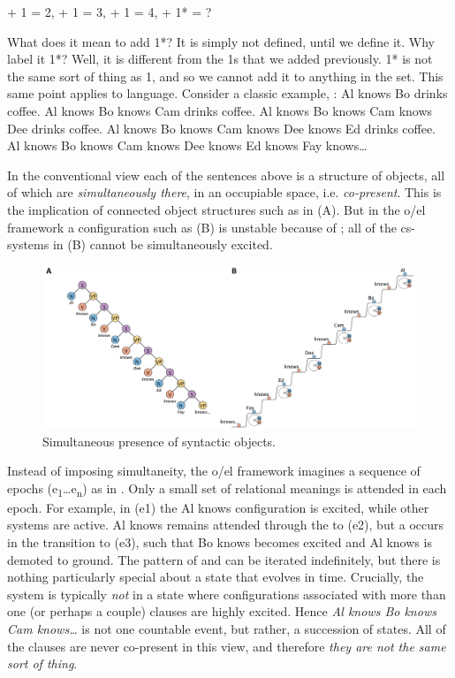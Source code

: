    + 1 = 2,  + 1 = 3,  + 1 = 4,  + 1* = ?
\z

  What does it mean to add 1*? It is simply not defined, until we define it. Why label it 1*? Well, it is different from the 1s that we added previously. 1* is not the same sort of thing as 1, and so we cannot add it to anything in the set. This same point applies to language. Consider a classic example, :
\ea
\ea
{Al knows Bo drinks coffee.}
\ex
{Al knows Bo knows Cam drinks coffee.}
\ex
{Al knows Bo knows Cam knows Dee drinks coffee.}
\ex
{Al knows Bo knows Cam knows Dee knows Ed drinks coffee.}
\ex
{Al knows Bo knows Cam knows Dee knows Ed knows Fay knows…}
\z
\z

In the conventional view each of the sentences above is a structure of objects, all of which are \textit{simultaneously there}, in an occupiable space, i.e. \textit{co-present}. This is the implication of connected object structures such as in {}(A). But in the o/el framework a configuration such as {}(B) is unstable because of ; all of the cs-sys\-tems in (B) cannot be simultaneously excited. 

  
\begin{figure}
\includegraphics[width=\textwidth]{figures/Tilsen-img105.png}
\caption{Simultaneous presence of syntactic objects.}
\label{fig:5:1}
\end{figure}
 

  Instead of imposing simultaneity, the o/el framework imagines a sequence of epochs (e\textsubscript{1}…e\textsubscript{n}) as in {}. Only a small set of relational meanings is attended in each epoch. For example, in (e1) the {\textbar}Al knows{\textbar} configuration is excited, while other systems are active. {\textbar}Al knows{\textbar} remains attended through the  to (e2),  but a  occurs in the transition to (e3), such that {\textbar}Bo knows{\textbar} becomes excited and {\textbar}Al knows{\textbar} is demoted to ground. The pattern of  and  can be iterated indefinitely, but there is nothing particularly special about a state that evolves in time. Crucially, the system is typically \textit{not} in a state where  configurations associated with more than one (or perhaps a couple) clauses are highly excited. Hence \textit{Al knows Bo knows Cam knows…} is not one countable event, but rather, a succession of states. All of the clauses are never co-present in this view, and therefore \textit{they are not the same sort of thing}.

